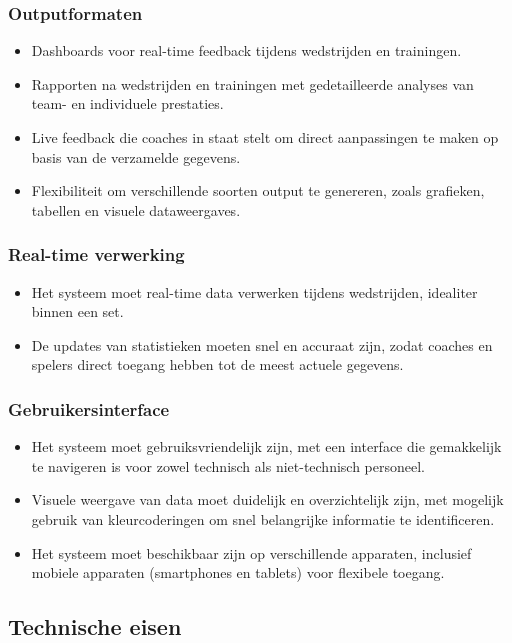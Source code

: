 \subsubsection{Outputformaten}
\begin{itemize}
  \item Dashboards voor real-time feedback tijdens wedstrijden en trainingen.
  \item Rapporten na wedstrijden en trainingen met gedetailleerde analyses van team- en individuele prestaties.
  \item Live feedback die coaches in staat stelt om direct aanpassingen te maken op basis van de verzamelde gegevens.
  \item Flexibiliteit om verschillende soorten output te genereren, zoals grafieken, tabellen en visuele dataweergaves.
\end{itemize}

\subsubsection{Real-time verwerking}
\begin{itemize}
  \item Het systeem moet real-time data verwerken tijdens wedstrijden, idealiter binnen een set.
  \item De updates van statistieken moeten snel en accuraat zijn, zodat coaches en spelers direct toegang hebben tot de meest actuele gegevens.
\end{itemize}

\subsubsection{Gebruikersinterface}
\begin{itemize}
  \item Het systeem moet gebruiksvriendelijk zijn, met een interface die gemakkelijk te navigeren is voor zowel technisch als niet-technisch personeel.
  \item Visuele weergave van data moet duidelijk en overzichtelijk zijn, met mogelijk gebruik van kleurcoderingen om snel belangrijke informatie te identificeren.
  \item Het systeem moet beschikbaar zijn op verschillende apparaten, inclusief mobiele apparaten (smartphones en tablets) voor flexibele toegang.
\end{itemize}

\subsection{Technische eisen}
